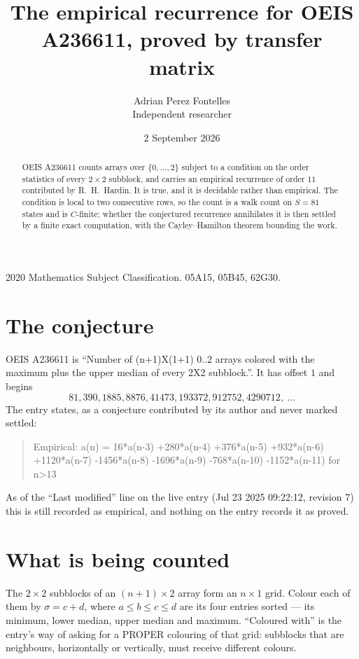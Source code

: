 \documentclass[11pt,a4paper]{article}
\title{The empirical recurrence for OEIS A236611, proved by transfer matrix}
\author{Adrian Perez Fontelles\\ \small Independent researcher}
\date{2 September 2026}
\theoremstyle{plain}
\theoremstyle{definition}
\begin{document}
\maketitle

\begin{abstract}
OEIS A236611 counts arrays over $\{0,\dots,2\}$ subject to a condition on the order
statistics of every $2\times2$ subblock, and carries an empirical recurrence of order
$11$ contributed by R.~H.~Hardin. It is true, and it is decidable rather than empirical.
The condition is local to two consecutive rows, so the count is a walk count on $S=81$
states and is $C$-finite; whether the conjectured recurrence annihilates it is then settled by
a finite exact computation, with the Cayley--Hamilton theorem bounding the work.
\end{abstract}

\noindent\small 2020 Mathematics Subject Classification. 05A15, 05B45, 62G30.\normalsize

\section{The conjecture}

OEIS A236611 is ``Number of (n+1)X(1+1) 0..2 arrays colored with the maximum plus the upper median of every 2X2 subblock.''. It has offset $1$ and begins
\[
81, 390, 1885, 8876, 41473, 193372, 912752, 4290712,\ \dots
\]
The entry states, as a conjecture contributed by its author and never marked settled:
\begin{quote}
Empirical: a(n) = 16*a(n-3) +280*a(n-4) +376*a(n-5) +932*a(n-6) +1120*a(n-7) -1456*a(n-8) -1696*a(n-9) -768*a(n-10) -1152*a(n-11) for n>13
\end{quote}
As of the ``Last modified'' line on the live entry (Jul 23 2025 09:22:12, revision 7) this is still
recorded as empirical, and nothing on the entry records it as proved.

\section{What is being counted}

The $2\times2$ subblocks of an $(n+1)\times2$ array form an
$n\times1$ grid. Colour each of them by $\sigma=c+d$, where $a\le b\le c\le d$ are its four entries sorted --- its minimum, lower median, upper median and maximum. ``Coloured with'' is the entry's way of
asking for a PROPER colouring of that grid: subblocks that are neighbours, horizontally or
vertically, must receive different colours.
\end{document}
